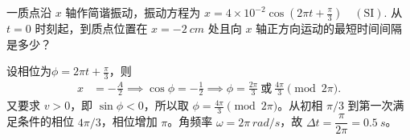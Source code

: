 \begin{exercise}
一质点沿 \(x\) 轴作简谐振动，振动方程为
 \(x=4\times10^{-2}\cos\left(2\pi t+\frac{\pi}{3}\right)\quad(\mathrm{SI}).\) 
从 \(t=0\) 时刻起，到质点位置在 \(x=-\SI{2}{cm}\) 处且向 \(x\) 轴正方向运动的最短时间间隔是多少？
\end{exercise}
\begin{solution}
设相位为$\phi=2\pi t+\frac{\pi}{3}$，则
\[
\begin{aligned}
x&=-\frac{A}{2}\implies
\cos\phi=-\frac12
\implies
\phi=\frac{2\pi}{3}\ \text{或}\ \frac{4\pi}{3}\pmod{2\pi}.
\end{aligned}
\]
又要求 \(v>0\)，即 \(\sin\phi<0\)，所以取 \(\phi=\frac{4\pi}{3}\pmod{2\pi}\)。从初相 \(\pi/3\) 到第一次满足条件的相位 \(4\pi/3\)，相位增加 \(\pi\)。角频率 \(\omega=2\pi\,\si{rad/s}\)，故 \(\Delta t=\dfrac{\pi}{2\pi}=\SI{0.5}{s}\)。
\end{solution}
